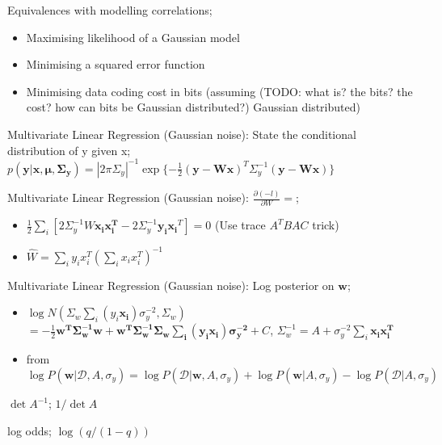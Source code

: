\documentclass{article}
\begin{document}
Equivalences with modelling correlations; \begin{itemize} \item Maximising likelihood of a Gaussian model \item Minimising a squared error function \item Minimising data coding cost in bits (assuming (TODO: what is? the bits? the cost? how can bits be Gaussian distributed?) Gaussian distributed) \end{itemize}

Multivariate Linear Regression (Gaussian noise): State the conditional distribution of y given x; $p(\mathbf{y|x, \mu, \Sigma_y}) = |2\pi\Sigma_y|^{-1}\exp\{-\frac{1}{2}(\mathbf{y-Wx})^T\Sigma_y^{-1}(\mathbf{y-Wx})\}$

Multivariate Linear Regression (Gaussian noise): $\frac{\partial(-l)}{\partial W} = $; \begin{itemize} \item $\frac{1}{2}\sum_i [2\Sigma^{-1}_yW\mathbf{x_ix_i^T}-2\Sigma_y^{-1}\mathbf{y_ix_i}^T]=0$ (Use trace $A^TBAC$ trick) \item $\hat{W} = \sum_i y_ix_i^T(\sum_i x_i x_i^T)^{-1}$ \end{itemize}


Multivariate Linear Regression (Gaussian noise): Log posterior on $\mathbf{w}$; \begin{itemize}
    \item $\log N(\Sigma_w\sum_i(y_i\mathbf{x_i})\sigma^{-2}_y,\Sigma_w)$ $ = -\frac{1}{2}\mathbf{w^T\Sigma_w^{-1}w+w^T\Sigma^{-1}_w\Sigma_w\sum_i(y_i\mathbf{x_i})\sigma_y^{-2}}+C$, $\Sigma_w^{-1} = A+\sigma_y^{-2}\sum_i \mathbf{x_ix_i^T}$
    \item from $\log P(\mathbf{w}|\mathcal{D},A,\sigma_y) = \log P(\mathcal{D}|\mathbf{w},A, \sigma_y)+\log P(\mathbf{w}|A,\sigma_y)-\log P(\mathcal{D}|A,\sigma_y)$
\end{itemize}

$\det A^{-1}$; $1/\det A$

log odds; $\log(q/(1-q))$
\end{document}

